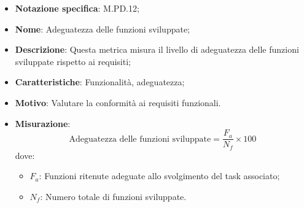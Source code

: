 \begin{itemize}
    \item \textbf{Notazione specifica}: M.PD.12;
    \item \textbf{Nome}: Adeguatezza delle funzioni sviluppate;
    \item \textbf{Descrizione}: Questa metrica misura il livello di adeguatezza delle funzioni sviluppate rispetto ai requisiti;
    \item \textbf{Caratteristiche}: Funzionalità, adeguatezza;
    \item \textbf{Motivo}: Valutare la conformità ai requisiti funzionali.
    \item \textbf{Misurazione}: 
    \[
    \text{Adeguatezza delle funzioni sviluppate} = \frac{F_{a}}{N_{f}} \times 100
    \]
    dove:
    \begin{itemize}
        \item $F_{a}$: Funzioni ritenute adeguate allo svolgimento del task associato;
        \item $N_{f}$: Numero totale di funzioni sviluppate.
    \end{itemize}
\end{itemize}
